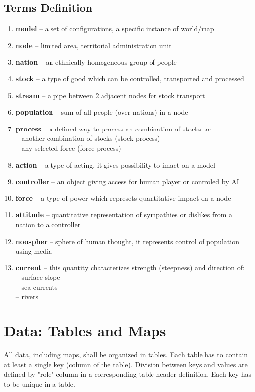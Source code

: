 \documentclass[a4paper,oneside,titlepage]{report}
\begin{document}
\section{Terms Definition}
\begin{enumerate}
  \setlength{\itemsep}{0pt}
  \setlength{\parskip}{0pt}
\item \textbf{model} -- a set of configurations, a specific instance of world$/$map
\item \textbf{node} -- limited area, territorial administration unit
\item \textbf{nation} -- an ethnically homogeneous group of people
\item \textbf{stock} -- a type of good which can be controlled, transported and processed  
\item \textbf{stream} -- a pipe between 2 adjacent nodes for stock transport
\item \textbf{population} -- sum of all people (over nations) in a node
\item \textbf{process} -- a defined way to process an combination of stocks to:\\
  -- another combination of stocks (stock process)\\
  -- any selected force (force process)
\item \textbf{action} -- a type of acting, it gives possibility to imact on a model
\item \textbf{controller} -- an object giving access for human player or controled by AI
\item \textbf{force} -- a type of power which represets quantitative impact on a node
\item \textbf{attitude} -- quantitative representation of sympathies or dislikes from a nation to a controller   
\item \textbf{noospher} -- sphere of human thought, it represents control of population using media
\item \textbf{current} -- this quantity characterizes strength (steepness) and direction of:\\
  -- surface slope\\
  -- sea currents\\
  -- rivers
\end{enumerate}

\chapter{Data: Tables and Maps}
All data, including maps, shall be organized in tables. Each table has to contain at least a single key (column of the table). Division between keys and values are defined by "role" column in a corresponding table header definition. Each key has to be unique in a table.
\end{document}
